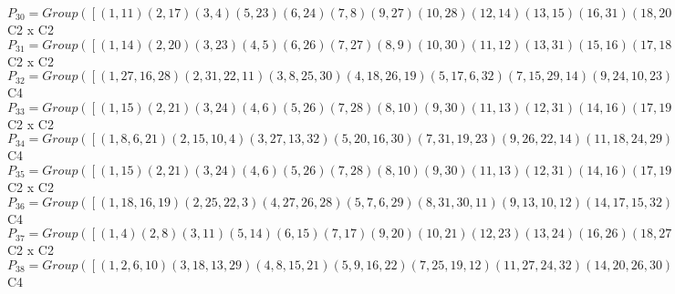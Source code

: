 \documentclass[varwidth=\maxdimen,border=10]{standalone}
\begin{document}
\begin{tabular}
$P_{30} = Group( [ ( 1,11)( 2,17)( 3, 4)( 5,23)( 6,24)( 7, 8)( 9,27)(10,28)(12,14)(13,15)(16,31)(18,20)(19,21)(22,32)(25,26)(29,30), ( 1,16)( 2,22)( 3,25)( 4,26)( 5, 6)( 7,29)( 8,30)( 9,10)(11,31)(12,13)(14,15)(17,32)(18,19)(20,21)(23,24)(27,28) ] )\cong$ C2 x C2\ \\
$P_{31} = Group( [ ( 1,14)( 2,20)( 3,23)( 4, 5)( 6,26)( 7,27)( 8, 9)(10,30)(11,12)(13,31)(15,16)(17,18)(19,32)(21,22)(24,25)(28,29), ( 1, 3)( 2, 7)( 4,11)( 5,12)( 6,13)( 8,17)( 9,18)(10,19)(14,23)(15,24)(16,25)(20,27)(21,28)(22,29)(26,31)(30,32) ] )\cong$ C2 x C2\ \\
$P_{32} = Group( [ ( 1,27,16,28)( 2,31,22,11)( 3, 8,25,30)( 4,18,26,19)( 5,17, 6,32)( 7,15,29,14)( 9,24,10,23)(12,20,13,21), ( 1,16)( 2,22)( 3,25)( 4,26)( 5, 6)( 7,29)( 8,30)( 9,10)(11,31)(12,13)(14,15)(17,32)(18,19)(20,21)(23,24)(27,28) ] )\cong$ C4\ \\
$P_{33} = Group( [ ( 1,15)( 2,21)( 3,24)( 4, 6)( 5,26)( 7,28)( 8,10)( 9,30)(11,13)(12,31)(14,16)(17,19)(18,32)(20,22)(23,25)(27,29), ( 1,13)( 2,19)( 3, 6)( 4,24)( 5,25)( 7,10)( 8,28)( 9,29)(11,15)(12,16)(14,31)(17,21)(18,22)(20,32)(23,26)(27,30) ] )\cong$ C2 x C2\ \\
$P_{34} = Group( [ ( 1, 8, 6,21)( 2,15,10, 4)( 3,27,13,32)( 5,20,16,30)( 7,31,19,23)( 9,26,22,14)(11,18,24,29)(12,17,25,28), ( 1, 6)( 2,10)( 3,13)( 4,15)( 5,16)( 7,19)( 8,21)( 9,22)(11,24)(12,25)(14,26)(17,28)(18,29)(20,30)(23,31)(27,32) ] )\cong$ C4\ \\
$P_{35} = Group( [ ( 1,15)( 2,21)( 3,24)( 4, 6)( 5,26)( 7,28)( 8,10)( 9,30)(11,13)(12,31)(14,16)(17,19)(18,32)(20,22)(23,25)(27,29), ( 1, 3)( 2, 7)( 4,11)( 5,12)( 6,13)( 8,17)( 9,18)(10,19)(14,23)(15,24)(16,25)(20,27)(21,28)(22,29)(26,31)(30,32) ] )\cong$ C2 x C2\ \\
$P_{36} = Group( [ ( 1,18,16,19)( 2,25,22, 3)( 4,27,26,28)( 5, 7, 6,29)( 8,31,30,11)( 9,13,10,12)(14,17,15,32)(20,24,21,23), ( 1,16)( 2,22)( 3,25)( 4,26)( 5, 6)( 7,29)( 8,30)( 9,10)(11,31)(12,13)(14,15)(17,32)(18,19)(20,21)(23,24)(27,28) ] )\cong$ C4\ \\
$P_{37} = Group( [ ( 1, 4)( 2, 8)( 3,11)( 5,14)( 6,15)( 7,17)( 9,20)(10,21)(12,23)(13,24)(16,26)(18,27)(19,28)(22,30)(25,31)(29,32), ( 1,13)( 2,19)( 3, 6)( 4,24)( 5,25)( 7,10)( 8,28)( 9,29)(11,15)(12,16)(14,31)(17,21)(18,22)(20,32)(23,26)(27,30) ] )\cong$ C2 x C2\ \\
$P_{38} = Group( [ ( 1, 2, 6,10)( 3,18,13,29)( 4, 8,15,21)( 5, 9,16,22)( 7,25,19,12)(11,27,24,32)(14,20,26,30)(17,31,28,23), ( 1, 6)( 2,10)( 3,13)( 4,15)( 5,16)( 7,19)( 8,21)( 9,22)(11,24)(12,25)(14,26)(17,28)(18,29)(20,30)(23,31)(27,32) ] )\cong$ C4\ \\

\end{tabular}
\end{document}
